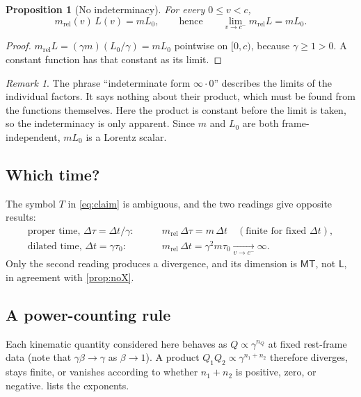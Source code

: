 \documentclass[11pt,a4paper]{article}
\newtheorem{proposition}{Proposition}
\theoremstyle{definition}
\theoremstyle{remark}
\newtheorem{remark}{Remark}
\newcommand{\mrel}{m_{\mathrm{rel}}}
\newcommand{\sfM}{\mathsf{M}}
\newcommand{\sfL}{\mathsf{L}}
\newcommand{\sfT}{\mathsf{T}}
\begin{document}
\begin{proposition}[No indeterminacy]\label{prop:product}
For every $0\le v<c$,
\begin{equation}
  \mrel(v)\,L(v)=mL_0,
  \qquad\text{hence}\qquad
  \lim_{v\to c^-}\mrel L=mL_0 .
  \label{eq:product}
\end{equation}
\end{proposition}

\begin{proof}
$\mrel L=(\gamma m)(L_0/\gamma)=mL_0$ pointwise on $[0,c)$, because
$\gamma\ge1>0$. A constant function has that constant as its limit.
\end{proof}

\begin{remark}
The phrase ``indeterminate form $\infty\cdot0$'' describes the limits of the
individual factors. It says nothing about their product, which must be found
from the functions themselves. Here the product is constant before the limit
is taken, so the indeterminacy is only apparent. Since $m$ and $L_0$ are both
frame-independent, $mL_0$ is a Lorentz scalar.
\end{remark}

\subsection{Which time?}\label{sec:time}

The symbol $T$ in \cref{eq:claim} is ambiguous, and the two readings give
opposite results:
\begin{align}
  \text{proper time, } \Delta\tau=\Delta t/\gamma:&\qquad
  \mrel\,\Delta\tau=m\,\Delta t \quad(\text{finite for fixed }\Delta t),
  \label{eq:proper}\\
  \text{dilated time, } \Delta t=\gamma\tau_0:&\qquad
  \mrel\,\Delta t=\gamma^{2}m\tau_0\xrightarrow[v\to c^-]{}\infty .
  \label{eq:dilated}
\end{align}
Only the second reading produces a divergence, and its dimension is
$\sfM\sfT$, not $\sfL$, in agreement with \cref{prop:noX}.

\subsection{A power-counting rule}\label{sec:power}

Each kinematic quantity considered here behaves as $Q\propto\gamma^{n_Q}$ at
fixed rest-frame data (note that $\gamma\beta\to\gamma$ as $\beta\to1$). A product
$Q_1Q_2\propto\gamma^{n_1+n_2}$ therefore diverges, stays finite, or vanishes
according to whether $n_1+n_2$ is positive, zero, or negative. 
lists the exponents.
\end{document}
